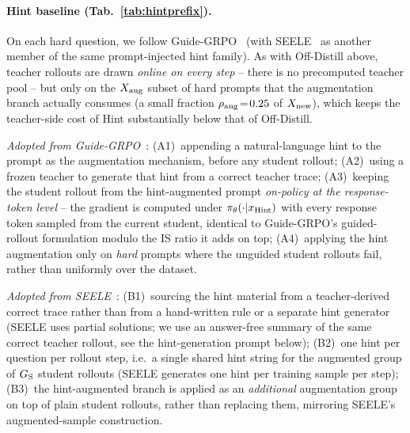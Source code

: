 \paragraph{Hint baseline (Tab.~\ref{tab:hintprefix}).}
On each hard question, we follow Guide-GRPO~\citep{nath2025adaptive} (with SEELE~\citep{li2025staying} as another member of the same prompt-injected hint family). As with Off-Distill above, teacher rollouts are drawn \emph{online on every step} -- there is no precomputed teacher pool -- but only on the $X_{\rm aug}$ subset of hard prompts that the augmentation branch actually consumes (a small fraction $\rho_{\rm aug}\!=\!0.25$ of $X_{\rm new}$), which keeps the teacher-side cost of Hint substantially below that of Off-Distill.

\emph{Adopted from Guide-GRPO}~\citep{nath2025adaptive}: (A1)~appending a natural-language hint to the prompt as the augmentation mechanism, before any student rollout; (A2)~using a frozen teacher to generate that hint from a correct teacher trace; (A3)~keeping the student rollout from the hint-augmented prompt \emph{on-policy at the response-token level} -- the gradient is computed under $\pi_\theta(\cdot|x_{\rm Hint})$ with every response token sampled from the current student, identical to Guide-GRPO's guided-rollout formulation modulo the IS ratio it adds on top; (A4)~applying the hint augmentation only on \emph{hard} prompts where the unguided student rollouts fail, rather than uniformly over the dataset.

\emph{Adopted from SEELE}~\citep{li2025staying}: (B1)~sourcing the hint material from a teacher-derived correct trace rather than from a hand-written rule or a separate hint generator (SEELE uses partial solutions; we use an answer-free summary of the same correct teacher rollout, see the hint-generation prompt below); (B2)~one hint per question per rollout step, i.e.\ a single shared hint string for the augmented group of $G_{\rm S}$ student rollouts (SEELE generates one hint per training sample per step); (B3)~the hint-augmented branch is applied as an \emph{additional} augmentation group on top of plain student rollouts, rather than replacing them, mirroring SEELE's augmented-sample construction.

